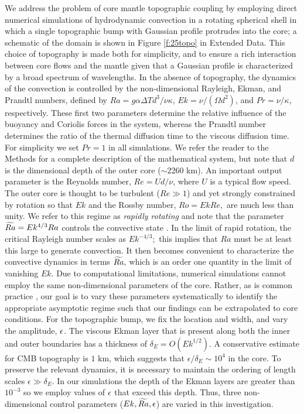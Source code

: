 We address the problem of core mantle topographic coupling by employing direct numerical simulations of \textcolor{\revtxt}{hydrodynamic} convection in a rotating spherical shell in which a single topographic bump with Gaussian profile protrudes into the core; a schematic of the domain is shown in Figure \ref{f:25topo} in Extended Data. This choice of topography is made both for simplicity, and to ensure a rich interaction between core flows and the mantle given that a Gaussian profile is characterized by a broad spectrum of wavelengths. 
 In the absence of topography, the dynamics of the convection \textcolor{\revtxt}{is} controlled by the non-dimensional Rayleigh, Ekman, and Prandtl numbers, defined by $Ra = g \alpha \Delta T d^3/\nu \kappa$, $Ek = \nu/(\Omega d^2)$, and $Pr = \nu/\kappa$, respectively. 
 These first two parameters determine the relative influence of the buoyancy and Coriolis forces in the system, whereas the Prandtl number determines the ratio of the thermal diffusion time to the viscous diffusion time. 
 For simplicity we set $Pr=1$ in all simulations. 
 \textcolor{\revtxt}{We refer the reader to the Methods for a complete description of the mathematical system, but note that $d$ is the dimensional depth of the outer core ($\sim 2260$ km).
 }
 \textcolor{\revtxt}{An important output parameter is the Reynolds number, $Re = U d/\nu$, where $U$ is a typical flow speed.
 The outer core is thought to be turbulent ($Re\gg1$) and yet strongly constrained by rotation so that $Ek $ and the Rossby number, $Ro = EkRe,$ are much less than unity.
 We refer to this regime as \textit{rapidly rotating} and note that the parameter $\widetilde{Ra} = Ek^{4/3} Ra$ controls the convective state \citep[e.g.][]{sC61,kJ12}. In the limit of rapid rotation, the critical Rayleigh number scales as $Ek^{-4/3};$  this implies that $Ra$ must be at least this large to generate convection. It then becomes convenient to characterize the convective dynamics in terms $\widetilde{Ra},$ which is an order one quantity in the limit of vanishing $Ek$.
 }
 \textcolor{\revtxt}{Due to} computational limitations, numerical simulations cannot employ the same non-dimensional parameters of the core. 
 Rather, as is common practice \citep[e.g.][]{uC10,mC21}, our goal is to vary these parameters systematically to identify the appropriate asymptotic regime such that our findings can be extrapolated to core conditions. 
 For the topographic bump, we fix the location and width, and vary the amplitude, $\epsilon$. 
 \textcolor{\revtxt}
 { The viscous Ekman layer that is present along both the inner and outer boundaries has a thickness of $\delta_E =O( Ek^{1/2})$. A conservative estimate for CMB topography is $1\text{ km}$, which suggests that $\epsilon /\delta_{E}\sim 10^{4}$ in the core. To preserve the relevant dynamics, it is necessary to maintain the ordering of length scales $\epsilon \gg \delta_{E}$. In our simulations the depth of the Ekman layers are greater than $10^{-3}$ so we employ values of $\epsilon$ that exceed this depth. Thus, three non-dimensional control parameters ($Ek, \widetilde{Ra}, \epsilon$) are varied in this investigation. }

